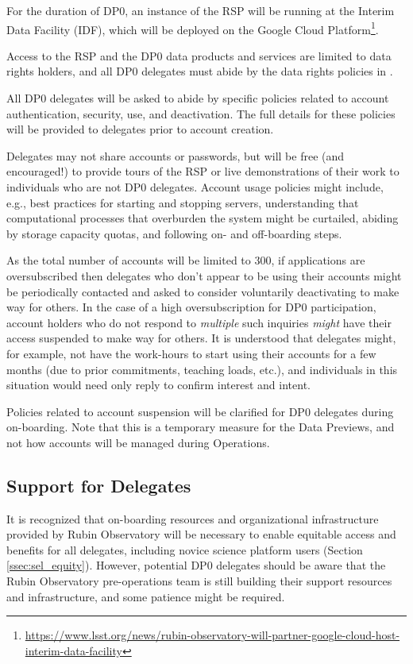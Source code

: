 \documentclass[DM,lsstdraft,authoryear,toc]{lsstdoc}
\begin{document}
For the duration of DP0, an instance of the RSP will be running at the Interim Data Facility (IDF), which will be deployed on the Google Cloud Platform\footnote{\url{https://www.lsst.org/news/rubin-observatory-will-partner-google-cloud-host-interim-data-facility}}.

Access to the RSP and the DP0 data products and services are limited to data rights holders, and all DP0 delegates must abide by the data rights policies in .

All DP0 delegates will be asked to abide by specific policies related to account authentication, security, use, and deactivation.
The full details for these policies will be provided to delegates prior to account creation. 

Delegates may not share accounts or passwords, but will be free (and encouraged!) to provide tours of the RSP or live demonstrations of their work to individuals who are not DP0 delegates.
Account usage policies might include, e.g., best practices for starting and stopping servers, understanding that computational processes that overburden the system might be curtailed, abiding by storage capacity quotas, and following on- and off-boarding steps.

As the total number of accounts will be limited to 300, if applications are oversubscribed then delegates who don't appear to be using their accounts might be periodically contacted and asked to consider voluntarily deactivating to make way for others.
In the case of a high oversubscription for DP0 participation, account holders who do not respond to \emph{multiple} such inquiries \emph{might} have their access suspended to make way for others.
It is understood that delegates might, for example, not have the work-hours to start using their accounts for a few months (due to prior commitments, teaching loads, etc.), and individuals in this situation would need only reply to confirm interest and intent. 

Policies related to account suspension will be clarified for DP0 delegates during on-boarding.
Note that this is a temporary measure for the Data Previews, and not how accounts will be managed during Operations.

\subsection{Support for Delegates}\label{ssec:res_sup}

It is recognized that on-boarding resources and organizational infrastructure provided by Rubin Observatory will be necessary to enable equitable access and benefits for all delegates, including novice science platform users (Section \ref{ssec:sel_equity}). 
However, potential DP0 delegates should be aware that the Rubin Observatory pre-operations team is still building their support resources and infrastructure, and some patience might be required. 
\end{document}
